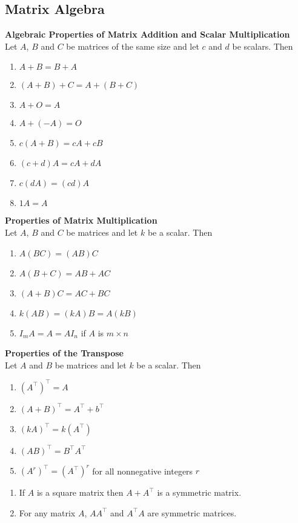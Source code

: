 \documentclass{article}
\begin{document}
\subsection{Matrix Algebra}
\begin{theorem}
    \textbf{Algebraic Properties of Matrix Addition and Scalar Multiplication}\\
    Let $A$, $B$ and $C$ be matrices of the same size and let $c$ and $d$ be scalars. Then
    \begin{enumerate}
        \item $A+B=B+A$
        \item $(A+B)+C=A+(B+C)$
        \item $A+O=A$
        \item $A+(-A)=O$
        \item $c(A+B)=cA + cB$
        \item $(c+d)A = cA+dA$
        \item $c(dA) = (cd)A$
        \item $1A=A$
    \end{enumerate}
\end{theorem}
\begin{theorem}
    \textbf{Properties of Matrix Multiplication}\\
    Let $A$, $B$ and $C$ be matrices and let $k$ be a scalar. Then
    \begin{enumerate}
        \item $A(BC) = (AB)C$
        \item $A(B+C) = AB + AC$
        \item $(A + B)C = AC + BC$
        \item $k(AB) = (kA)B = A(kB)$
        \item $I_mA=A=AI_n$ if $A$ is $m\times n$
    \end{enumerate}
\end{theorem}
\begin{theorem}
    \textbf{Properties of the Transpose}\\
    Let $A$ and $B$ be matrices and let $k$ be a scalar. Then
    \begin{enumerate}
        \item $(A^\intercal)^\intercal = A$
        \item $(A+B)^\intercal = A^\intercal + b^\intercal$
        \item $(kA)^\intercal = k(A^\intercal)$
        \item $(AB)^\intercal = B^\intercal A^\intercal$
        \item $(A^r)^\intercal = (A^\intercal)^r$ for all nonnegative integers $r$
    \end{enumerate}
\end{theorem}
\begin{theorem}
    \begin{enumerate}
        \item If $A$ is a square matrix then $A+A^\intercal$ is a symmetric matrix.
        \item For any matrix $A$, $AA^\intercal$ and $A^\intercal A$ are symmetric matrices.
    \end{enumerate}
\end{theorem}
\end{document}
